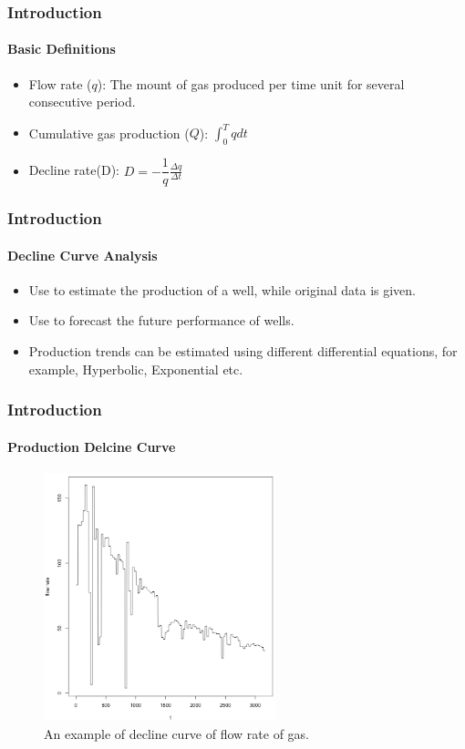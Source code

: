 \documentclass[11pt]{beamer}
\begin{document}
    \begin{frame}
		\frametitle{Introduction}
        \framesubtitle{Basic Definitions}
		\justifying
		\begin{itemize}
			\item Flow rate ($q$): The mount of gas produced per time unit for several consecutive period.
			\item Cumulative gas production ($Q$): $\int_{0}^{T}qdt $	
			\item Decline rate(D): $D=-\dfrac{1}{q}\frac{\Delta q}{\Delta t}$	
		\end{itemize}
	\end{frame}
\begin{frame}
\frametitle{Introduction}
\framesubtitle{Decline Curve Analysis}
\begin{itemize}
\item Use to estimate the production of a well, while original data is given.
\item Use to forecast the future performance of wells.
\item Production trends can be estimated using different differential equations, for example, Hyperbolic, Exponential etc.
\end{itemize}
\end{frame}
	\begin{frame}
		\frametitle{Introduction}
		\framesubtitle{Production Delcine Curve}
		\justifying
\begin{figure}
\begin{center}
\includegraphics[width=0.6\textwidth  ]{decline} 
\caption{An example of decline curve of flow rate of gas. }\label{smooth}
\end{center}
\end{figure}
	\end{frame}		
\end{document}
